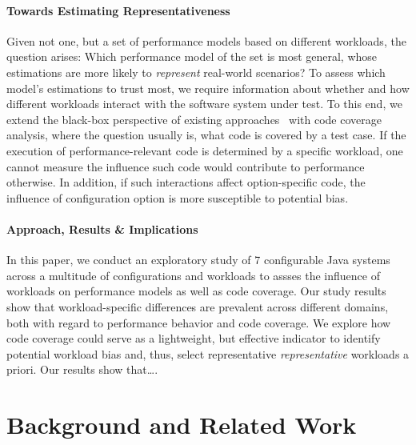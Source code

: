 \paragraph*{Towards Estimating Representativeness}
Given not one, but a set of performance models based on different workloads, the question arises: Which performance model of the set is most general, whose estimations are more likely to \emph{represent} real-world scenarios? 
To assess which model's estimations to trust most, we require information about whether and how different workloads interact with the software system under test. 
To this end, we extend the black-box perspective of existing approaches~\cite{dorn2020,siegmundPerformanceinfluenceModelsHighly2015,haDeepPerf2019,perfAL,guoVariabilityawarePerformancePrediction2013,sarkarCostEfficientSamplingPerformance,guo_2018_data,fourier_learning_2015,perLasso} with code coverage analysis, where the question usually is, what code is covered by a test case.
If the execution of performance-relevant code is determined by a specific workload, one cannot measure the influence such code would contribute to performance otherwise.
In addition, if such interactions affect option-specific code, the influence of configuration option is more susceptible to potential bias. 

\paragraph*{Approach, Results \& Implications}
In this paper, we conduct an exploratory study of {\color{red}7} configurable Java systems across a multitude of configurations and workloads to assses the influence of workloads on performance models as well as code coverage. 
Our study results show that workload-specific differences are prevalent across different domains, both with regard to performance behavior and code coverage. We explore how code coverage could serve as a lightweight, but effective indicator to identify potential workload bias and, thus, select representative \emph{representative} workloads a priori. Our results show that\ldots.


\section{Background and Related Work}
